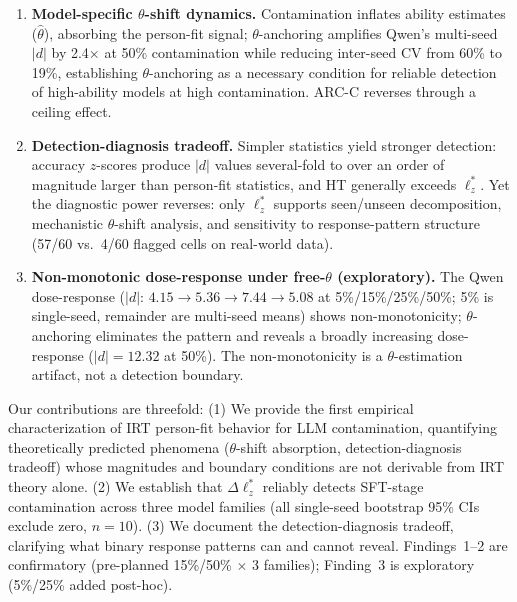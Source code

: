 \begin{enumerate}[leftmargin=*,nosep]
\item \textbf{Model-specific $\theta$-shift dynamics.} Contamination inflates ability estimates ($\hat{\theta}$), absorbing the person-fit signal; $\theta$-anchoring amplifies Qwen's multi-seed $|d|$ by 2.4$\times$ at 50\% contamination while reducing inter-seed CV from 60\% to 19\%, establishing $\theta$-anchoring as a necessary condition for reliable detection of high-ability models at high contamination. ARC-C reverses through a ceiling effect.

\item \textbf{Detection-diagnosis tradeoff.} Simpler statistics yield stronger detection: accuracy $z$-scores produce $|d|$ values several-fold to over an order of magnitude larger than person-fit statistics, and HT generally exceeds $\ell_z^*$. Yet the diagnostic power reverses: only $\ell_z^*$ supports seen/unseen decomposition, mechanistic $\theta$-shift analysis, and sensitivity to response-pattern structure (57/60 vs.\ 4/60 flagged cells on real-world data).

\item \textbf{Non-monotonic dose-response under free-$\theta$ (exploratory).} The Qwen dose-response ($|d|$: $4.15 \to 5.36 \to 7.44 \to 5.08$ at 5\%/15\%/25\%/50\%; 5\% is single-seed, remainder are multi-seed means) shows non-monotonicity; $\theta$-anchoring eliminates the pattern and reveals a broadly increasing dose-response ($|d|{=}12.32$ at 50\%). The non-monotonicity is a $\theta$-estimation artifact, not a detection boundary.
\end{enumerate}

Our contributions are threefold:
(1) We provide the first empirical characterization of IRT person-fit behavior for LLM contamination, quantifying theoretically predicted phenomena ($\theta$-shift absorption, detection-diagnosis tradeoff) whose magnitudes and boundary conditions are not derivable from IRT theory alone.
(2) We establish that $\Delta\ell_z^*$ reliably detects SFT-stage contamination across three model families (all single-seed bootstrap 95\% CIs exclude zero, $n{=}10$).
(3) We document the detection-diagnosis tradeoff, clarifying what binary response patterns can and cannot reveal.
Findings~1--2 are confirmatory (pre-planned 15\%/50\% $\times$ 3 families); Finding~3 is exploratory (5\%/25\% added post-hoc).
